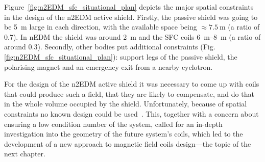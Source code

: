 Figure~\ref{fig:n2EDM_sfc_situational_plan} depicts the major spatial constraints in the design of the n2EDM active shield.
Firstly, the passive shield was going to be \SI{5}{\metre} large in each direction, with the available space being $\approx \SI{7.5}{\metre}$ (a ratio of \num{0.7}).
In nEDM the shield was around \SI{2}{\meter} and the SFC coils \SIrange[range-phrase = --, range-units=single]{6}{8}{\meter} (a ratio of around \num{0.3}).
Secondly, other bodies put additional constraints (Fig.\,\ref{fig:n2EDM_sfc_situational_plan}): support legs of the passive shield, the polarising magnet and an emergency exit from a nearby cyclotron.

For the design of the n2EDM active shield it was necessary to come up with coils that could produce such a field, that they are likely to compensate, and do that in the whole volume occupied by the shield. Unfortunately, because of spatial constraints no known design could be used~\cite{Turner1986,Wong1991,Turner1993,Crozier1993,Sanchez2007,Sanchez2009}. This, together with a concern about ensuring a low condition number of the system, called for an in-depth investigation into the geometry of the future system's coils, which led to the development of a new approach to magnetic field coils design---the topic of the next chapter.

